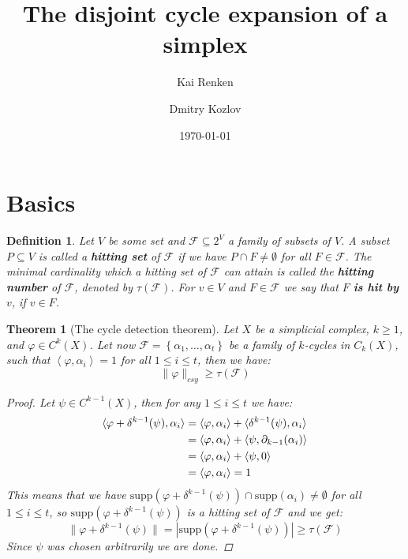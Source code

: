 \documentclass{article}
\title{The disjoint cycle expansion of a simplex}
\author{Kai Renken \and Dmitry Kozlov}
\date{\today}
\newcommand{\supp}{\mathrm{supp}}
\newtheorem{defi}{Definition}[section]
\newtheorem{thm}{Theorem}[section]
\begin{document}
\maketitle


\begin{abstract}

\end{abstract}

\section{Basics}

\begin{defi}
Let $V$ be some set and $\mathcal{F}\subseteq 2^V$ a family of subsets of $V$. A subset $P\subseteq V$ is called a \textbf{hitting set} of $\mathcal{F}$ if we have $P\cap F\neq\emptyset$ for all $F\in\mathcal{F}$. The minimal cardinality which a hitting set of $\mathcal{F}$ can attain is called the \textbf{hitting number} of $\mathcal{F}$, denoted by $\tau(\mathcal{F})$. For $v\in V$ and $F\in\mathcal{F}$ we say that $F$ \textbf{is hit by} $v$, if $v\in F$.
\end{defi}

\begin{thm}[The cycle detection theorem]\label{proposition1}
Let $X$ be a simplicial complex, $k\geq 1$, and $\varphi\in C^k(X)$. Let now $\mathcal{F}=\left\{\alpha_1,\ldots,\alpha_t\right\}$ be a family of $k$-cycles in $C_k(X)$, such that $\left\langle\varphi,\alpha_i\right\rangle=1$ for all $1\leq i\leq t$, then we have:
\[
\|\varphi\|_{csy}\geq\tau(\mathcal{F})
\]
\begin{proof}
Let $\psi\in C^{k-1}(X)$, then for any $1\leq i\leq t$ we have:
\begin{align}
\langle\varphi+\delta^{k-1}(\psi),\alpha_i\rangle&=\langle\varphi,\alpha_i\rangle+\langle\delta^{k-1}(\psi),\alpha_i\rangle\notag\\
&=\langle\varphi,\alpha_i\rangle+\langle\psi,\partial_{k-1}(\alpha_i)\rangle\notag\\
&=\langle\varphi,\alpha_i\rangle+\langle\psi,0\rangle\notag\\
&=\langle\varphi,\alpha_i\rangle=1\notag
\end{align}
This means that we have $\supp(\varphi+\delta^{k-1}(\psi))\cap \supp(\alpha_i)\neq\emptyset$ for all $1\leq i\leq t$, so $\supp(\varphi+\delta^{k-1}(\psi))$ is a hitting set of $\mathcal{F}$ and we get:
\[
\|\varphi+\delta^{k-1}(\psi)\|=|\supp(\varphi+\delta^{k-1}(\psi))|\geq\tau(\mathcal{F})
\]
Since $\psi$ was chosen arbitrarily we are done.
\end{proof}
\end{thm}
\end{document}
